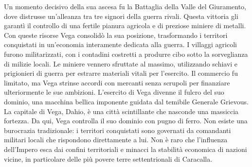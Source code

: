 \documentclass[10pt, a4paper]{report}
\begin{document}
\begin{multicols}{2}
Un momento decisivo della sua ascesa fu la Battaglia della Valle del Giuramento, dove distrusse un’alleanza tra tre signori della guerra rivali. Questa vittoria gli garantì il controllo di una fertile pianura agricola e di preziose miniere di metalli. Con queste risorse Vega consolidò la sua posizione, trasformando i territori conquistati in un'economia interamente dedicata alla guerra. I villaggi agricoli furono militarizzati, con i contadini costretti a produrre cibo sotto la sorveglianza di milizie locali. Le miniere vennero sfruttate al massimo, utilizzando schiavi e prigionieri di guerra per estrarre materiali vitali per l’esercito. Il commercio fu limitato, ma Vega strinse accordi con mercanti senza scrupoli per finanziare ulteriormente le sue ambizioni.
L’esercito di Vega divenne il fulcro del suo dominio, una macchina bellica imponente guidata dal temibile Generale Grievous.
La capitale di Vega, Dahio, è una città scintillante che nasconde una massiccia fortezza. Da qui, Vega controlla il suo dominio con pugno di ferro. Non esiste una burocrazia tradizionale: i territori conquistati sono governati da comandanti militari locali che rispondono direttamente a lui. Non è raro che l'influenza dell'Impero esca dai confini territoriali e minacci la stabilità economica di nazioni vicine, in particolare delle più povere terre settentrionali di Caracalla.


\end{multicols}
\end{document}
